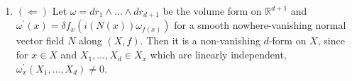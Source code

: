 \begin{enumerate}
\item $(\Leftarrow)$ Let $\omega=d r_{1} \wedge \ldots \wedge d r_{d+1}$ be the volume form on $\mathbb{R}^{d+1}$ 
and $\omega^{\prime}(x)=\delta f_{x}(i(N(x)) \omega_{f(x)})$ for a smooth nowhere-vanishing normal vector field $N$ along $(X, f)$. 
Then it is a non-vanishing $d$-form on $X$, since for $x \in X$ and $X_{1}, \ldots, X_{d} \in X_{x}$ which are linearly independent, $\omega_{x}^{\prime}(X_{1}, \ldots, X_{d}) \neq 0$.


\end{enumerate}
